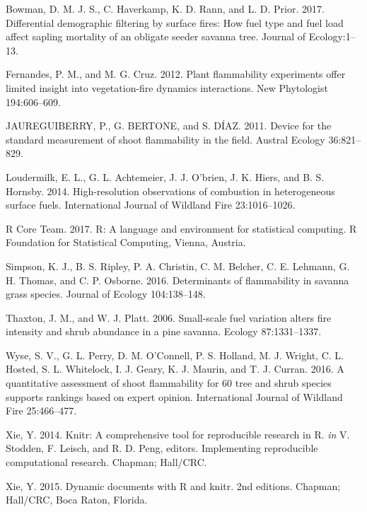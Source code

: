 \documentclass[11pt,a4paper]{article}
\begin{document}
\leavevmode\hypertarget{ref-Bowman2017}{}%
Bowman, D. M. J. S., C. Haverkamp, K. D. Rann, and L. D. Prior. 2017.
Differential demographic filtering by surface fires: How fuel type and
fuel load affect sapling mortality of an obligate seeder savanna tree.
Journal of Ecology:1--13.

\leavevmode\hypertarget{ref-Fernandes2012}{}%
Fernandes, P. M., and M. G. Cruz. 2012. Plant flammability experiments
offer limited insight into vegetation-fire dynamics interactions. New
Phytologist 194:606--609.

\leavevmode\hypertarget{ref-JAUREGUIBERRY2011}{}%
JAUREGUIBERRY, P., G. BERTONE, and S. DÍAZ. 2011. Device for the
standard measurement of shoot flammability in the field. Austral Ecology
36:821--829.

\leavevmode\hypertarget{ref-Loudermilk2014}{}%
Loudermilk, E. L., G. L. Achtemeier, J. J. O'brien, J. K. Hiers, and B.
S. Hornsby. 2014. High-resolution observations of combustion in
heterogeneous surface fuels. International Journal of Wildland Fire
23:1016--1026.

\leavevmode\hypertarget{ref-R_Core_Team_2017}{}%
R Core Team. 2017. R: A language and environment for statistical
computing. R Foundation for Statistical Computing, Vienna, Austria.

\leavevmode\hypertarget{ref-Simpson2016}{}%
Simpson, K. J., B. S. Ripley, P. A. Christin, C. M. Belcher, C. E.
Lehmann, G. H. Thomas, and C. P. Osborne. 2016. Determinants of
flammability in savanna grass species. Journal of Ecology 104:138--148.

\leavevmode\hypertarget{ref-Thaxton2006}{}%
Thaxton, J. M., and W. J. Platt. 2006. Small-scale fuel variation alters
fire intensity and shrub abundance in a pine savanna. Ecology
87:1331--1337.

\leavevmode\hypertarget{ref-Wyse2016}{}%
Wyse, S. V., G. L. Perry, D. M. O'Connell, P. S. Holland, M. J. Wright,
C. L. Hosted, S. L. Whitelock, I. J. Geary, K. J. Maurin, and T. J.
Curran. 2016. A quantitative assessment of shoot flammability for 60
tree and shrub species supports rankings based on expert opinion.
International Journal of Wildland Fire 25:466--477.

\leavevmode\hypertarget{ref-Xie_2014}{}%
Xie, Y. 2014. Knitr: A comprehensive tool for reproducible research in
R. \emph{in} V. Stodden, F. Leisch, and R. D. Peng, editors.
Implementing reproducible computational research. Chapman; Hall/CRC.

\leavevmode\hypertarget{ref-Xie_2015}{}%
Xie, Y. 2015. Dynamic documents with R and knitr. 2nd editions. Chapman;
Hall/CRC, Boca Raton, Florida.
\end{document}
